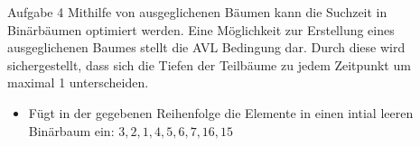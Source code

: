 \begin{frame}{Aufgabe 4}
Mithilfe von ausgeglichenen Bäumen kann die Suchzeit in Binärbäumen optimiert werden. Eine Möglichkeit zur Erstellung eines ausgeglichenen Baumes stellt die
AVL Bedingung dar. Durch diese wird sichergestellt, dass sich die Tiefen der Teilbäume zu jedem Zeitpunkt um maximal 1 unterscheiden.

\begin{itemize}
	\item Fügt in der gegebenen Reihenfolge die Elemente in einen intial leeren Binärbaum ein: $3, 2, 1, 4, 5, 6, 7, 16, 15$
\end{itemize}
\end{frame}